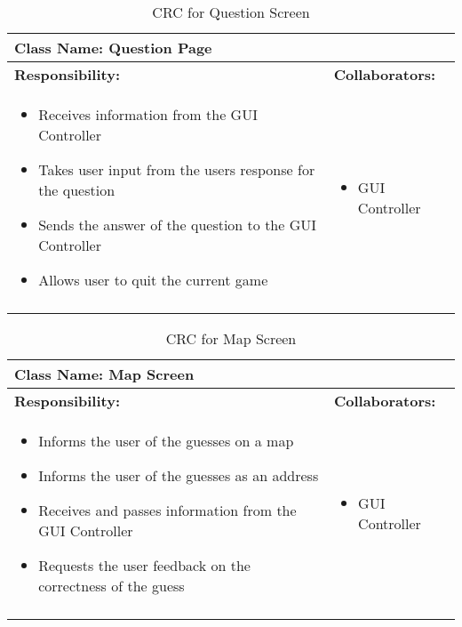\documentclass[titlepage]{article}
\begin{document}
	\begin{longtable}{| p{} | p{} |}
			\hline
			 \multicolumn{2}{|l|}{\textbf{Class Name: Question Page}} \\
			\hline
			\textbf{Responsibility:} & \textbf{Collaborators:} \\
			\hline
				\begin{itemize}
					\item Receives information from the GUI Controller
					\item Takes user input from the users response for the question
					\item Sends the answer of the question to the GUI Controller
					\item Allows user to quit the current game
				\end{itemize} & 
				\begin{itemize}
					\item GUI Controller
				\end{itemize} 
				\\
			\hline
		\caption{CRC for Question Screen}
	\end{longtable}	
	
	\begin{longtable}{| p{} | p{} |}
			\hline
			 \multicolumn{2}{|l|}{\textbf{Class Name: Map Screen}} \\
			\hline
			\textbf{Responsibility:} & \textbf{Collaborators:} \\
			\hline
				\begin{itemize}
					\item Informs the user of the guesses on a map
					\item Informs the user of the guesses as an address
					\item Receives and passes information from the GUI Controller
					\item Requests the user feedback on the correctness of the guess
				\end{itemize} & 
				\begin{itemize}
					\item GUI Controller
				\end{itemize} 
				\\
			\hline
		\caption{CRC for Map Screen}
	\end{longtable}
	
\end{document}
